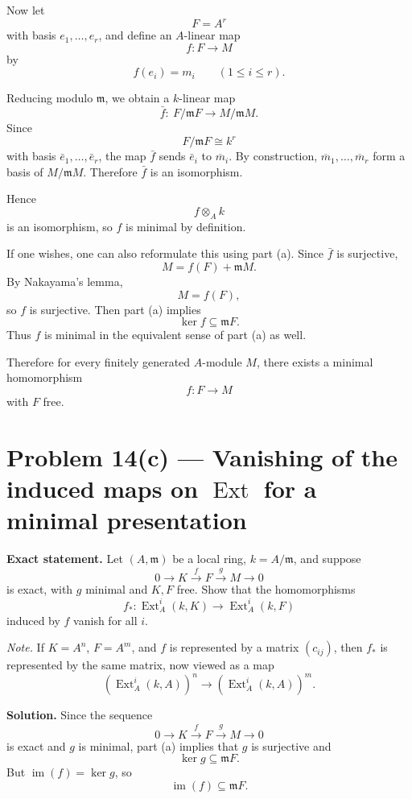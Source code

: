 \documentclass[12pt,a4paper,oneside]{report}
\theoremstyle{notespace}
\begin{document}
Now let
\[
F=A^r
\]
with basis \(e_1,\dots,e_r\), and define an \(A\)-linear map
\[
f:F\to M
\]
by
\[
f(e_i)=m_i
\qquad (1\le i\le r).
\]

Reducing modulo \(\mathfrak m\), we obtain a \(k\)-linear map
\[
\bar f:\ F/\mathfrak m F \to M/\mathfrak m M.
\]
Since
\[
F/\mathfrak m F \cong k^r
\]
with basis \(\bar e_1,\dots,\bar e_r\), the map \(\bar f\) sends \(\bar e_i\) to \(\overline{m}_i\). By construction, \(\overline{m}_1,\dots,\overline{m}_r\) form a basis of \(M/\mathfrak m M\). Therefore \(\bar f\) is an isomorphism.

Hence
\[
f\otimes_A k
\]
is an isomorphism, so \(f\) is minimal by definition.

\medskip

If one wishes, one can also reformulate this using part (a). Since \(\bar f\) is surjective,
\[
M=f(F)+\mathfrak m M.
\]
By Nakayama's lemma,
\[
M=f(F),
\]
so \(f\) is surjective. Then part (a) implies
\[
\ker f\subseteq \mathfrak m F.
\]
Thus \(f\) is minimal in the equivalent sense of part (a) as well.

\medskip

Therefore for every finitely generated \(A\)-module \(M\), there exists a minimal homomorphism
\[
f:F\to M
\]
with \(F\) free.

\section{Problem 14(c) --- Vanishing of the induced maps on \texorpdfstring{$\operatorname{Ext}$}{Ext} for a minimal presentation}

\textbf{Exact statement.}
Let \((A,\mathfrak m)\) be a local ring, \(k=A/\mathfrak m\), and suppose
\[
0\longrightarrow K \xrightarrow{\,f\,} F \xrightarrow{\,g\,} M \longrightarrow 0
\]
is exact, with \(g\) minimal and \(K,F\) free. Show that the homomorphisms
\[
f_*:\operatorname{Ext}_A^i(k,K)\longrightarrow \operatorname{Ext}_A^i(k,F)
\]
induced by \(f\) vanish for all \(i\).

\medskip

\textit{Note.} If \(K=A^n\), \(F=A^m\), and \(f\) is represented by a matrix \((c_{ij})\), then \(f_*\) is represented by the same matrix, now viewed as a map
\[
(\operatorname{Ext}_A^i(k,A))^n\to (\operatorname{Ext}_A^i(k,A))^m.
\]

\textbf{Solution.}
Since the sequence
\[
0\to K \xrightarrow{f} F \xrightarrow{g} M \to 0
\]
is exact and \(g\) is minimal, part (a) implies that \(g\) is surjective and
\[
\ker g\subseteq \mathfrak m F.
\]
But \(\operatorname{im}(f)=\ker g\), so
\[
\operatorname{im}(f)\subseteq \mathfrak m F.
\]
\end{document}
